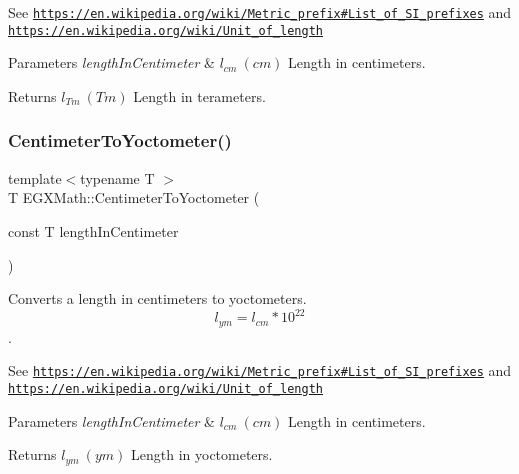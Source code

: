 See \href{https://en.wikipedia.org/wiki/Metric_prefix#List_of_SI_prefixes}{\tt https\+://en.\+wikipedia.\+org/wiki/\+Metric\+\_\+prefix\#\+List\+\_\+of\+\_\+\+S\+I\+\_\+prefixes} and \href{https://en.wikipedia.org/wiki/Unit_of_length}{\tt https\+://en.\+wikipedia.\+org/wiki/\+Unit\+\_\+of\+\_\+length} 
\begin{DoxyParams}{Parameters}
{\em length\+In\+Centimeter} & $ l_{cm}\ (cm)$ Length in centimeters. \\
\hline
\end{DoxyParams}
\begin{DoxyReturn}{Returns}
$ l_{Tm}\ (Tm)$ Length in terameters. 
\end{DoxyReturn}
\mbox{\label{group___e_g_x_math-_conversions-_length_conversions-_s_i-_centimeter-_s_i_ga251be5adc836253a22a995d9f2ce6782}} 
\subsubsection{\texorpdfstring{Centimeter\+To\+Yoctometer()}{CentimeterToYoctometer()}}
{\footnotesize\ttfamily template$<$typename T $>$ \\
T E\+G\+X\+Math\+::\+Centimeter\+To\+Yoctometer (\begin{DoxyParamCaption}\item[{const T}]{length\+In\+Centimeter }\end{DoxyParamCaption})}



Converts a length in centimeters to yoctometers. \[ l_{ym}=l_{cm} * 10^{22} \]. 

See \href{https://en.wikipedia.org/wiki/Metric_prefix#List_of_SI_prefixes}{\tt https\+://en.\+wikipedia.\+org/wiki/\+Metric\+\_\+prefix\#\+List\+\_\+of\+\_\+\+S\+I\+\_\+prefixes} and \href{https://en.wikipedia.org/wiki/Unit_of_length}{\tt https\+://en.\+wikipedia.\+org/wiki/\+Unit\+\_\+of\+\_\+length} 
\begin{DoxyParams}{Parameters}
{\em length\+In\+Centimeter} & $ l_{cm}\ (cm)$ Length in centimeters. \\
\hline
\end{DoxyParams}
\begin{DoxyReturn}{Returns}
$ l_{ym}\ (ym)$ Length in yoctometers. 
\end{DoxyReturn}
\mbox{\label{group___e_g_x_math-_conversions-_length_conversions-_s_i-_centimeter-_s_i_gace13ddc9d41561595a03d858577763c3}} 
